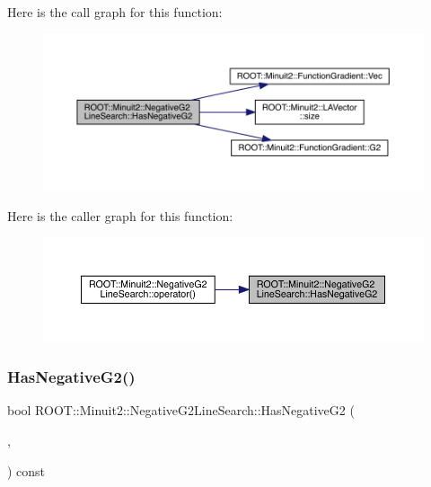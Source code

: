 Here is the call graph for this function\+:\nopagebreak
\begin{figure}[H]
\begin{center}
\leavevmode
\includegraphics[width=350pt]{d3/d6b/classROOT_1_1Minuit2_1_1NegativeG2LineSearch_a5450b0e5a0144e9c3e6028e8ae4a2c76_cgraph}
\end{center}
\end{figure}
Here is the caller graph for this function\+:\nopagebreak
\begin{figure}[H]
\begin{center}
\leavevmode
\includegraphics[width=350pt]{d3/d6b/classROOT_1_1Minuit2_1_1NegativeG2LineSearch_a5450b0e5a0144e9c3e6028e8ae4a2c76_icgraph}
\end{center}
\end{figure}
\mbox{\label{classROOT_1_1Minuit2_1_1NegativeG2LineSearch_a5450b0e5a0144e9c3e6028e8ae4a2c76}} 
\subsubsection{\texorpdfstring{HasNegativeG2()}{HasNegativeG2()}\hspace{0.1cm}{\footnotesize\ttfamily [2/2]}}
{\footnotesize\ttfamily bool R\+O\+O\+T\+::\+Minuit2\+::\+Negative\+G2\+Line\+Search\+::\+Has\+Negative\+G2 (\begin{DoxyParamCaption}\item[{const \mbox{\hyperlink{classROOT_1_1Minuit2_1_1FunctionGradient}{Function\+Gradient}} \&}]{,  }\item[{const \mbox{\hyperlink{classROOT_1_1Minuit2_1_1MnMachinePrecision}{Mn\+Machine\+Precision}} \&}]{ }\end{DoxyParamCaption}) const}

